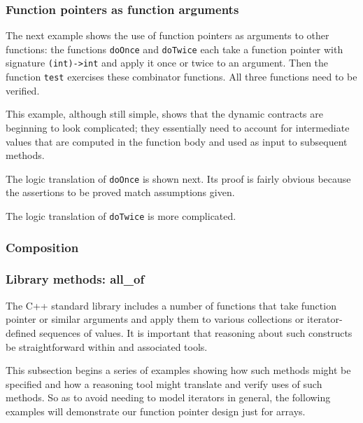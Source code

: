 \subsubsection{Function pointers as function arguments}
The next example shows the use of function pointers as arguments to other functions: the functions \lstinline|doOnce|
and \lstinline|doTwice| each take a function pointer with signature \lstinline|(int)->int| and apply it once or twice to an
argument. Then the function \lstinline|test| exercises these combinator functions. All three functions need to be verified.



This example, although still simple, shows that the dynamic contracts
are beginning to look complicated; they essentially need to account
for intermediate values that are computed in the function body and used as input to subsequent methods.


 
The logic translation of \lstinline|doOnce| is shown next. Its proof is fairly obvious because the assertions to be proved match 
assumptions given.



The logic translation of \lstinline|doTwice| is more complicated.




\subsubsection{Composition}

\TODO{}

\subsubsection{Library methods: all\_of}
\label{sec:libraryMethods}
The C++ standard library includes a number of functions that take function pointer or similar arguments and apply them to various 
collections or iterator-defined sequences of values. 
It is important
that reasoning about such constructs be straightforward within \NAME and
associated tools. 

This subsection begins a series of examples showing how such methods might be 
specified and how a reasoning tool might translate and verify uses of such methods. So as to avoid needing to model iterators in general, the 
following examples will demonstrate our function pointer design just
for arrays.

